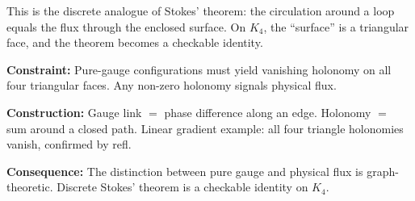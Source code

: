 \documentclass[11pt,a4paper]{book}
\def\texttt#1{#1}%
\begin{document}
This is the discrete analogue of Stokes' theorem: the circulation around a loop equals the flux through the enclosed surface. On $K_4$, the ``surface'' is a triangular face, and the theorem becomes a checkable identity.

\textbf{Constraint:} Pure-gauge configurations must yield vanishing holonomy on all four triangular faces. Any non-zero holonomy signals physical flux.

\textbf{Construction:} Gauge link $=$ phase difference along an edge. Holonomy $=$ sum around a closed path. Linear gradient example: all four triangle holonomies vanish, confirmed by \texttt{refl}.

\textbf{Consequence:} The distinction between pure gauge and physical flux is graph-theoretic. Discrete Stokes' theorem is a checkable identity on $K_4$.
\end{document}
